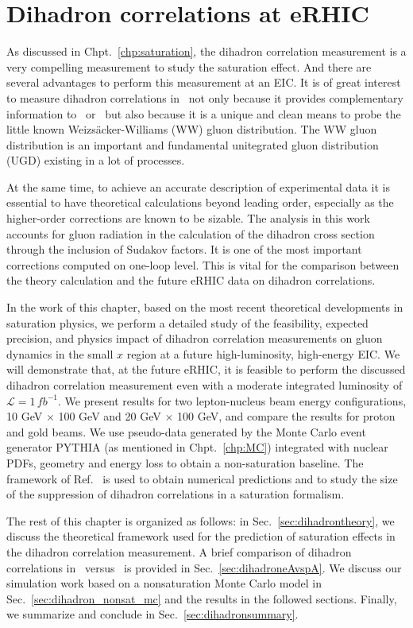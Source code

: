\chapter{Dihadron correlations at eRHIC}
\label{chp:dihadron}
As discussed in Chpt.~\ref{chp:saturation}, the dihadron correlation measurement
is a very compelling measurement to study the saturation effect. And there are
several advantages to perform this measurement at an EIC. It is of great
interest to measure dihadron correlations in \eA\ not only because it provides
complementary information to \dA\ or \pA\ but also because it is a unique and
clean means to probe the little known Weizs\"{a}cker-Williams (WW) gluon
distribution. The WW gluon distribution is an important and fundamental
unitegrated gluon distribution (UGD) existing in a lot of processes.

At the same time, to achieve an accurate description of experimental data it is
essential to have theoretical calculations beyond leading order, especially as
the higher-order corrections are known to be sizable. The analysis in this work
accounts for gluon radiation in the calculation of the dihadron cross section
through the inclusion of Sudakov factors. It is one of the most important
corrections computed on one-loop level. This is vital for the comparison between
the theory calculation and the future eRHIC data on dihadron correlations.

In the work of this chapter, based on the most recent theoretical developments in saturation
physics, we perform a detailed study of the feasibility, expected precision, and
physics impact of dihadron correlation measurements on gluon dynamics in the
small $x$ region at a future high-luminosity, high-energy EIC. We will
demonstrate that, at the future eRHIC, it is feasible to perform the discussed
dihadron correlation measurement even with a moderate integrated luminosity of
$\mathcal{L}=1 \, fb^{-1}$. We present results for two lepton-nucleus beam energy
configurations, 10 GeV $\times$ 100 GeV and 20 GeV $\times$ 100 GeV, and compare
the results for proton and gold beams. We use pseudo-data generated by the Monte
Carlo event generator PYTHIA (as mentioned in Chpt.~\ref{chp:MC}) integrated with nuclear PDFs,
geometry and energy loss to obtain a non-saturation baseline. The framework of
Ref.~\cite{Dominguez:2011wm} is used to obtain numerical predictions and to
study the size of the suppression of dihadron correlations in a saturation
formalism.


The rest of this chapter is organized as follows: in
Sec.~\ref{sec:dihadrontheory}, we discuss the theoretical framework used for the
prediction of saturation effects in the dihadron correlation measurement. A
brief comparison of dihadron correlations in \eA\ versus \pA\ is provided in
Sec.~\ref{sec:dihadroneAvspA}. We discuss our simulation work based on a
nonsaturation Monte Carlo model in Sec.~\ref{sec:dihadron_nonsat_mc} and the
results in the followed sections. Finally, we summarize and conclude in
Sec.~\ref{sec:dihadronsummary}.





